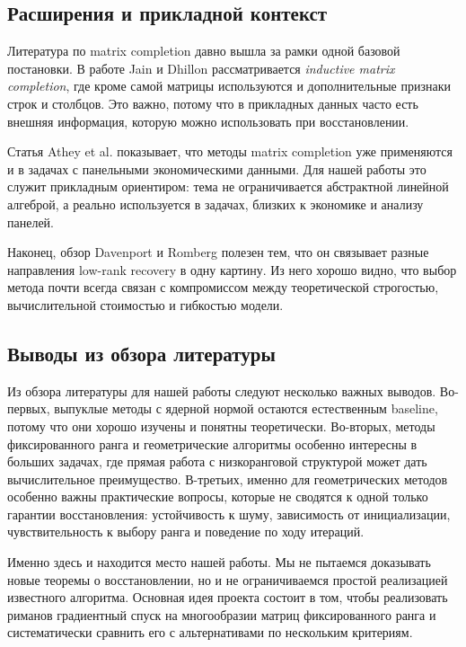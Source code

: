 \documentclass[a4paper,12pt]{article}
\begin{document}
\subsection{Расширения и прикладной контекст}

Литература по matrix completion давно вышла за рамки одной базовой постановки. В работе Jain и Dhillon \cite{inductive} рассматривается \textit{inductive matrix completion}, где кроме самой матрицы используются и дополнительные признаки строк и столбцов. Это важно, потому что в прикладных данных часто есть внешняя информация, которую можно использовать при восстановлении.

Статья Athey et al. \cite{causal-panel} показывает, что методы matrix completion уже применяются и в задачах с панельными экономическими данными. Для нашей работы это служит прикладным ориентиром: тема не ограничивается абстрактной линейной алгеброй, а реально используется в задачах, близких к экономике и анализу панелей.

Наконец, обзор Davenport и Romberg \cite{overview} полезен тем, что он связывает разные направления low-rank recovery в одну картину. Из него хорошо видно, что выбор метода почти всегда связан с компромиссом между теоретической строгостью, вычислительной стоимостью и гибкостью модели.

\subsection{Выводы из обзора литературы}

Из обзора литературы для нашей работы следуют несколько важных выводов. Во-первых, выпуклые методы с ядерной нормой остаются естественным baseline, потому что они хорошо изучены и понятны теоретически. Во-вторых, методы фиксированного ранга и геометрические алгоритмы особенно интересны в больших задачах, где прямая работа с низкоранговой структурой может дать вычислительное преимущество. В-третьих, именно для геометрических методов особенно важны практические вопросы, которые не сводятся к одной только гарантии восстановления: устойчивость к шуму, зависимость от инициализации, чувствительность к выбору ранга и поведение по ходу итераций.

Именно здесь и находится место нашей работы. Мы не пытаемся доказывать новые теоремы о восстановлении, но и не ограничиваемся простой реализацией известного алгоритма. Основная идея проекта состоит в том, чтобы реализовать риманов градиентный спуск на многообразии матриц фиксированного ранга и систематически сравнить его с альтернативами по нескольким критериям.
\end{document}
